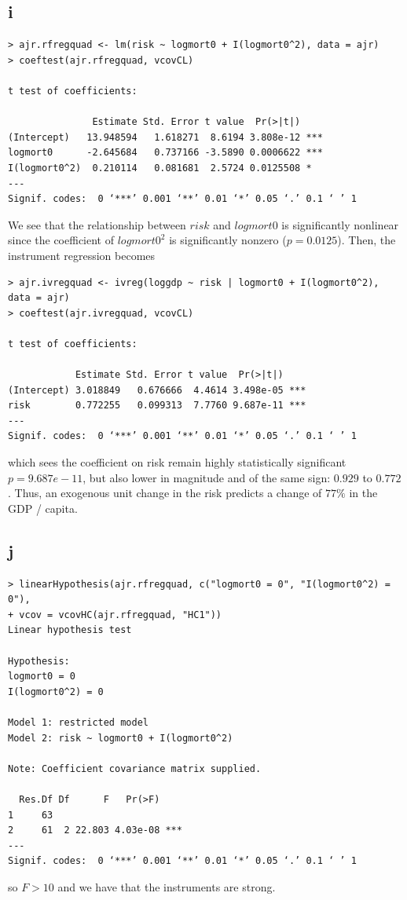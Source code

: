 \documentclass[12pt,letterpaper]{article}
\theoremstyle{definition}
\begin{document}
\subsection*{i}

\begin{Verbatim}[fontsize=\small]
> ajr.rfregquad <- lm(risk ~ logmort0 + I(logmort0^2), data = ajr)
> coeftest(ajr.rfregquad, vcovCL)

t test of coefficients:

               Estimate Std. Error t value  Pr(>|t|)
(Intercept)   13.948594   1.618271  8.6194 3.808e-12 ***
logmort0      -2.645684   0.737166 -3.5890 0.0006622 ***
I(logmort0^2)  0.210114   0.081681  2.5724 0.0125508 *
---
Signif. codes:  0 ‘***’ 0.001 ‘**’ 0.01 ‘*’ 0.05 ‘.’ 0.1 ‘ ’ 1
\end{Verbatim}

We see that the relationship between $risk$ and $logmort0$ is significantly nonlinear since the coefficient of $logmort0^{2}$ is significantly nonzero ($p = 0.0125$). Then, the instrument regression becomes
\begin{Verbatim}[fontsize=\small]
> ajr.ivregquad <- ivreg(loggdp ~ risk | logmort0 + I(logmort0^2), data = ajr)
> coeftest(ajr.ivregquad, vcovCL)

t test of coefficients:

            Estimate Std. Error t value  Pr(>|t|)
(Intercept) 3.018849   0.676666  4.4614 3.498e-05 ***
risk        0.772255   0.099313  7.7760 9.687e-11 ***
---
Signif. codes:  0 ‘***’ 0.001 ‘**’ 0.01 ‘*’ 0.05 ‘.’ 0.1 ‘ ’ 1
\end{Verbatim}
which sees the coefficient on risk remain highly statistically significant $p = 9.687e-11$, but also lower in magnitude and of the same sign: $0.929$ to $0.772$. Thus, an exogenous unit change in the risk predicts a change of $77\%$ in the GDP / capita.

\subsection*{j}

\begin{Verbatim}[fontsize=\small]
> linearHypothesis(ajr.rfregquad, c("logmort0 = 0", "I(logmort0^2) = 0"),
+ vcov = vcovHC(ajr.rfregquad, "HC1"))
Linear hypothesis test

Hypothesis:
logmort0 = 0
I(logmort0^2) = 0

Model 1: restricted model
Model 2: risk ~ logmort0 + I(logmort0^2)

Note: Coefficient covariance matrix supplied.

  Res.Df Df      F   Pr(>F)
1     63
2     61  2 22.803 4.03e-08 ***
---
Signif. codes:  0 ‘***’ 0.001 ‘**’ 0.01 ‘*’ 0.05 ‘.’ 0.1 ‘ ’ 1
\end{Verbatim}
so $F > 10$ and we have that the instruments are strong.
\end{document}
